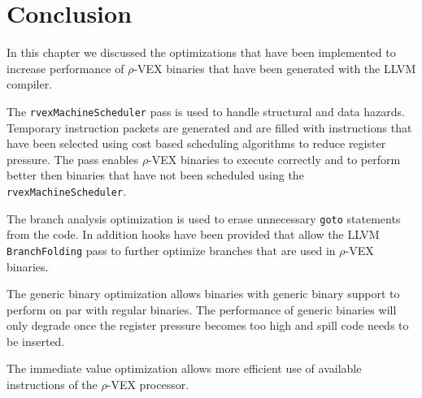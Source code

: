 \section{Conclusion}
In this chapter we discussed the optimizations that have been implemented to increase performance of $\rho$-VEX binaries that have been generated with the LLVM compiler.

The \texttt{rvexMachineScheduler} pass is used to handle structural and data hazards. Temporary instruction packets are generated and are filled with instructions that have been selected using cost based scheduling algorithms to reduce register pressure. The pass enables $\rho$-VEX binaries to execute correctly and to perform better then binaries that have not been scheduled using the \texttt{rvexMachineScheduler}.

The branch analysis optimization is used to erase unnecessary \texttt{goto} statements from the code. In addition hooks have been provided that allow the LLVM \texttt{BranchFolding} pass to further optimize branches that are used in $\rho$-VEX binaries.

The generic binary optimization allows binaries with generic binary support to perform on par with regular binaries. The performance of generic binaries will only degrade once the register pressure becomes too high and spill code needs to be inserted.

The immediate value optimization allows more efficient use of available instructions of the  $\rho$-VEX processor.
\acresetall


